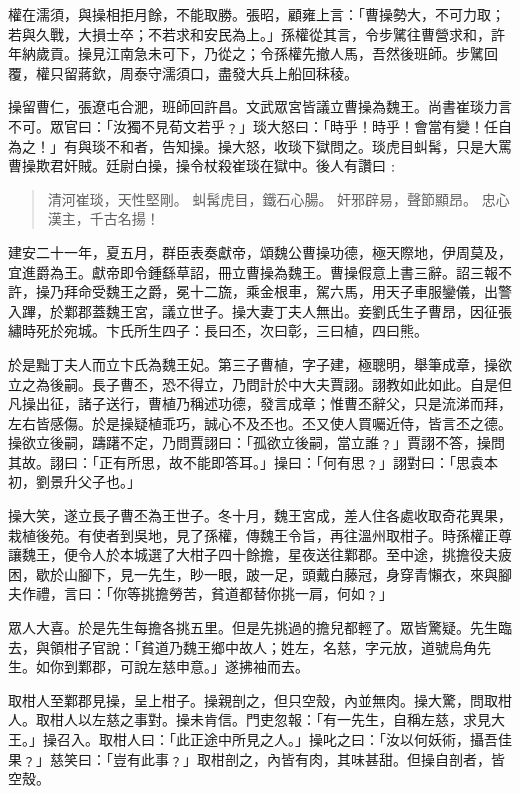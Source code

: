 權在濡須，與操相拒月餘，不能取勝。張昭，顧雍上言：「曹操勢大，不可力取；若與久戰，大損士卒；不若求和安民為上。」孫權從其言，令步騭往曹營求和，許年納歲貢。操見江南急未可下，乃從之；令孫權先撤人馬，吾然後班師。步騭回覆，權只留蔣欽，周泰守濡須口，盡發大兵上船回秣稜。

操留曹仁，張遼屯合淝，班師回許昌。文武眾宮皆議立曹操為魏王。尚書崔琰力言不可。眾官曰：「汝獨不見荀文若乎﹖」琰大怒曰：「時乎！時乎！會當有變！任自為之！」有與琰不和者，告知操。操大怒，收琰下獄問之。琰虎目虯髯，只是大罵曹操欺君奸賊。廷尉白操，操令杖殺崔琰在獄中。後人有讚曰﹕

\begin{quote}
清河崔琰，天性堅剛。
虯髯虎目，鐵石心腸。
奸邪辟易，聲節顯昂。
忠心漢主，千古名揚！
\end{quote}

建安二十一年，夏五月，群臣表奏獻帝，頌魏公曹操功德，極天際地，伊周莫及，宜進爵為王。獻帝即令鍾繇草詔，冊立曹操為魏王。曹操假意上書三辭。詔三報不許，操乃拜命受魏王之爵，冕十二旒，乘金根車，駕六馬，用天子車服鑾儀，出警入蹕，於鄴郡蓋魏王宮，議立世子。操大妻丁夫人無出。妾劉氏生子曹昂，因征張繡時死於宛城。卞氏所生四子：長曰丕，次曰彰，三曰植，四曰熊。

於是黜丁夫人而立卞氏為魏王妃。第三子曹植，字子建，極聰明，舉筆成章，操欲立之為後嗣。長子曹丕，恐不得立，乃問計於中大夫賈詡。詡教如此如此。自是但凡操出征，諸子送行，曹植乃稱述功德，發言成章；惟曹丕辭父，只是流涕而拜，左右皆感傷。於是操疑植乖巧，誠心不及丕也。丕又使人買囑近侍，皆言丕之德。操欲立後嗣，躊躇不定，乃問賈詡曰：「孤欲立後嗣，當立誰﹖」賈詡不答，操問其故。詡曰：「正有所思，故不能即答耳。」操曰：「何有思﹖」詡對曰：「思袁本初，劉景升父子也。」

操大笑，遂立長子曹丕為王世子。冬十月，魏王宮成，差人住各處收取奇花異果，栽植後苑。有使者到吳地，見了孫權，傳魏王令旨，再往溫州取柑子。時孫權正尊讓魏王，便令人於本城選了大柑子四十餘擔，星夜送往鄴郡。至中途，挑擔役夫疲困，歇於山腳下，見一先生，眇一眼，跛一足，頭戴白藤冠，身穿青懶衣，來與腳夫作禮，言曰：「你等挑擔勞苦，貧道都替你挑一肩，何如﹖」

眾人大喜。於是先生每擔各挑五里。但是先挑過的擔兒都輕了。眾皆驚疑。先生臨去，與領柑子官說：「貧道乃魏王鄉中故人；姓左，名慈，字元放，道號烏角先生。如你到鄴郡，可說左慈申意。」遂拂袖而去。

取柑人至鄴郡見操，呈上柑子。操親剖之，但只空殼，內並無肉。操大驚，問取柑人。取柑人以左慈之事對。操未肯信。門吏忽報：「有一先生，自稱左慈，求見大王。」操召入。取柑人曰：「此正途中所見之人。」操叱之曰：「汝以何妖術，攝吾佳果﹖」慈笑曰：「豈有此事﹖」取柑剖之，內皆有肉，其味甚甜。但操自剖者，皆空殼。

